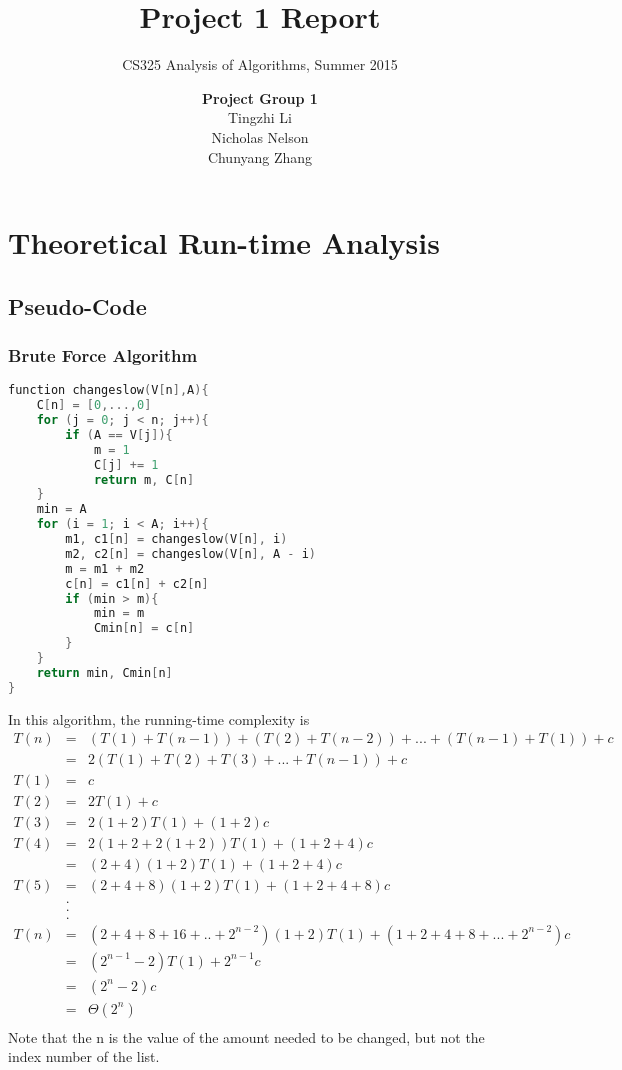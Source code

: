 \documentclass[11pt]{scrreprt}
\title{\textbf{Project 1 Report}}
\subtitle{CS325 Analysis of Algorithms, Summer 2015}
\author{\textsf{\textbf{Project Group 1}}\\
		\textsf{Tingzhi Li}\\
		\textsf{Nicholas Nelson}\\
		\textsf{Chunyang Zhang}}
\date{}
\begin{document}
\maketitle

\chapter{Theoretical Run-time Analysis}

\section{Pseudo-Code}
\subsection {Brute Force Algorithm}

\begin{lstlisting}[language=c]
function changeslow(V[n],A){
	C[n] = [0,...,0]
	for (j = 0; j < n; j++){
		if (A == V[j]){
			m = 1
			C[j] += 1
			return m, C[n]
	}
	min = A
	for (i = 1; i < A; i++){
		m1, c1[n] = changeslow(V[n], i)
		m2, c2[n] = changeslow(V[n], A - i)
		m = m1 + m2
		c[n] = c1[n] + c2[n]
		if (min > m){
			min = m
			Cmin[n] = c[n]
		}
	}
	return min, Cmin[n]
}
\end{lstlisting}
In this algorithm, the running-time complexity is
\begin{eqnarray*}
T(n) 	& = & (T(1)+ T(n-1)) + (T(2) + T(n-2)) + ... + (T(n-1) + T(1)) + c\\
		& = & 2(T(1) + T(2) + T(3) + ... + T(n-1)) + c\\
T(1)	& = & c\\
T(2) 	& = & 2T(1) + c\\
T(3) 	& = & 2(1+2)T(1) + (1+2)c\\
T(4) 	& = & 2(1+2+2(1+2))T(1) + (1+2+4)c\\
	 	& = & (2+4)(1+2)T(1) + (1+2+4)c\\
T(5) 	& = & (2+4+8)(1+2)T(1) + (1+2+4+8)c\\
		& . & \\
		& . & \\
		& . & \\
T(n) 	& = & (2+4+8+16+..+2^{n-2})(1+2)T(1) + (1+2+4+8+...+2^{n-2})c\\
		& = & (2^{n-1}-2)T(1) + 2^{n-1}c\\
		& = & (2^n-2)c\\
		& = & \Theta(2^n)\\
\end{eqnarray*}
Note that the n is the value of the amount needed to be changed, but not the index number of the list.
\end{document}
